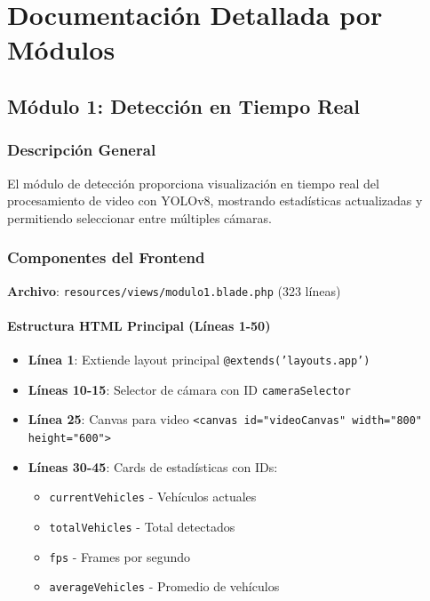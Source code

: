 \section{Documentación Detallada por Módulos}

\subsection{Módulo 1: Detección en Tiempo Real}

\subsubsection{Descripción General}

El módulo de detección proporciona visualización en tiempo real del procesamiento de video con YOLOv8, mostrando estadísticas actualizadas y permitiendo seleccionar entre múltiples cámaras.

\subsubsection{Componentes del Frontend}

\textbf{Archivo}: \texttt{resources/views/modulo1.blade.php} (323 líneas)

\paragraph{Estructura HTML Principal (Líneas 1-50)}

\begin{itemize}
    \item \textbf{Línea 1}: Extiende layout principal \texttt{@extends('layouts.app')}
    \item \textbf{Líneas 10-15}: Selector de cámara con ID \texttt{cameraSelector}
    \item \textbf{Línea 25}: Canvas para video \texttt{<canvas id="videoCanvas" width="800" height="600">}
    \item \textbf{Líneas 30-45}: Cards de estadísticas con IDs:
    \begin{itemize}
        \item \texttt{currentVehicles} - Vehículos actuales
        \item \texttt{totalVehicles} - Total detectados
        \item \texttt{fps} - Frames por segundo
        \item \texttt{averageVehicles} - Promedio de vehículos
    \end{itemize}
\end{itemize}

